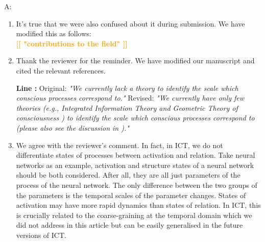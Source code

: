 \documentclass[utf8]{article}
\newenvironment{ans}  
    {\color{Black}\noindent A:}
    {~\newline}
\newcommand{\revise}[3]{
	\newline
	\newline
    \noindent
    \textbf{Line #1:}
    \newline
    Original:\newline
    \textit{"#2"}
    \newline
    \newline
    Revised:\newline
    \textit{"#3"}\newline}
\newcommand{\toWrite}[1]{\noindent
	\textcolor{Orange}{\textbf{[[ #1 ]]}}}
\begin{document}
    	\begin{ans}
    		\begin{enumerate}
    			\item It's true that we were also confused about it during submission. 
    			We have modified this as follows: \\
    			\toWrite{"contributions to the field"}
    			
    			\item Thank the reviewer for the reminder. We have modified our manuscript and cited the relevant references. 
    			\revise{}
    			{We currently lack a theory to identify the scale which conscious processes correspond to.}
    			{We currently have only few theories (e.g., Integrated Information Theory \citep{hoel2016can} and Geometric Theory of consciousness \citep{fekete2011towards,fekete2012lack}) to identify the scale which conscious processes correspond to (please also see the discussion in \cite{fekete2016system}).}    			
    			
    			\item We agree with the reviewer's comment. 
    			In fact, in ICT, we do not differentiate states of processes between activation and relation. Take neural networks as an example, activation and structure states of a neural network should be both considered. After all, they are all just parameters of the process of the neural network. The only difference between the two groups of the parameters is the temporal scales of the parameter changes. States of activation may have more rapid dynamics than states of relation. In ICT, this is crucially related to the coarse-graining at the temporal domain which we did not address in this article but can be easily generalised in the future versions of ICT. 
    			
    			
    			
    		\end{enumerate}
    		
    	\end{ans}
        
        
\end{document}

